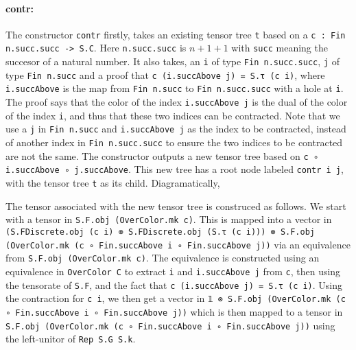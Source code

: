 \documentclass[a4paper, 11pt]{article}
\newcommand{\tensorTree}[1]{
\begin{center}
  \fcolorbox{mycolor}{white}{%
#1}
\end{center}
}
\begin{document}
\paragraph{contr:}
The constructor \lstinline|contr| firstly, takes an existing tensor tree \lstinline|t| based on a 
\lstinline|c : Fin n.succ.succ -> S.C|. Here \lstinline|n.succ.succ| is $n + 1 + 1$ with \lstinline|succ| meaning 
the succesor of a natural number. 
It also takes,
an \lstinline|i| of type \lstinline|Fin n.succ.succ|, \lstinline|j| of type \lstinline|Fin n.succ|
and a proof that \lstinline|c (i.succAbove j) = S.τ (c i)|, where \lstinline|i.succAbove| is the map from \lstinline|Fin n.succ| to \lstinline|Fin n.succ.succ| with a hole at \lstinline|i|. 
The proof says that the color of the index \lstinline|i.succAbove j| is the dual of the color of the index \lstinline|i|, and thus that these 
two indices can be contracted.
Note that we use a \lstinline|j| in \lstinline|Fin n.succ| and \lstinline|i.succAbove j| as the index to be contracted, instead 
of another index in  \lstinline|Fin n.succ.succ| to ensure the two indices to be contracted are not the same. 
The constructor outputs a new tensor tree based on \lstinline|c ∘ i.succAbove ∘ j.succAbove|. 
This new tree has a root node labeled \lstinline|contr i j|, with the tensor tree \lstinline|t| as its child.
Diagramatically, 
\tensorTree{
  \begin{tikzpicture}
    \node[draw=black] (A) at (0,0) {\lstinline|contr i j|};
    \node (B) at (0,-1) {\lstinline|t|};
    \draw[->] (A) -- (B);
  \end{tikzpicture} 
}
The tensor associated with the new tensor tree is construced as follows. 
We start with a tensor in \lstinline|S.F.obj (OverColor.mk c)|.
This is mapped into a vector in \lstinline|(S.FDiscrete.obj (c i) ⊗ S.FDiscrete.obj (S.τ (c i))) ⊗ S.F.obj (OverColor.mk (c ∘ Fin.succAbove i ∘ Fin.succAbove j))| via an equivalence from 
\lstinline|S.F.obj (OverColor.mk c)|. The equivalence is constructed using an equivalence 
in \lstinline|OverColor C| to extract \lstinline|i| and \lstinline|i.succAbove j| from \lstinline|c|,
then using the tensorate of \lstinline|S.F|, and the fact that \lstinline|c (i.succAbove j) = S.τ (c i)|. 
Using the contraction for \lstinline|c i|, we then get a vector in 
\lstinline|𝟙 ⊗ S.F.obj (OverColor.mk (c ∘ Fin.succAbove i ∘ Fin.succAbove j))| which is then 
mapped to a tensor in \lstinline|S.F.obj (OverColor.mk (c ∘ Fin.succAbove i ∘ Fin.succAbove j))| 
using the left-unitor of \lstinline|Rep S.G S.k|.
\end{document}
